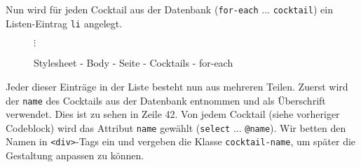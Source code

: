 \begin{figure}[ht]\centering\resizebox{!}{0cm}{\begin{minipage}{\textwidth}\end{minipage}}\end{figure}
\vspace*{-1.2cm}




Nun wird für jeden Cocktail aus der Datenbank (\texttt{for-each} ... \texttt{cocktail}) ein Listen-Eintrag \texttt{li} angelegt.

\renewcommand{\thefigure}{2.17}
\begin{figure}[H]
\label{code:stylesheet-body-site-cocktails-for-each}



$\vdots$



\caption{Stylesheet - Body - Seite - Cocktails - for-each}
\end{figure}

\begin{figure}[ht]\centering\resizebox{!}{0cm}{\begin{minipage}{\textwidth}\end{minipage}}\end{figure}






Jeder dieser Einträge in der Liste besteht nun aus mehreren Teilen. Zuerst wird der \texttt{name} des Cocktails aus der Datenbank entnommen und als Überschrift verwendet. Dies ist zu sehen in Zeile 42. Von jedem Cocktail (siehe vorheriger Codeblock) wird das Attribut \texttt{name} gewählt (\texttt{select} ... \texttt{@name}). Wir betten den Namen in \texttt{<div>}-Tags ein und vergeben die Klasse \texttt{cocktail-name}, um später die Gestaltung anpassen zu können.











